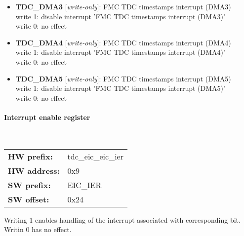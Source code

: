 \begin{itemize}
\begin{small}
\\
write 1: disable interrupt 'FMC TDC timestamps interrupt (DMA2)'\\write 0: no effect
\end{small}
\item \begin{small}
{\bf 
TDC\_DMA3
} [\emph{write-only}]: FMC TDC timestamps interrupt (DMA3)
\\
write 1: disable interrupt 'FMC TDC timestamps interrupt (DMA3)'\\write 0: no effect
\end{small}
\item \begin{small}
{\bf 
TDC\_DMA4
} [\emph{write-only}]: FMC TDC timestamps interrupt (DMA4)
\\
write 1: disable interrupt 'FMC TDC timestamps interrupt (DMA4)'\\write 0: no effect
\end{small}
\item \begin{small}
{\bf 
TDC\_DMA5
} [\emph{write-only}]: FMC TDC timestamps interrupt (DMA5)
\\
write 1: disable interrupt 'FMC TDC timestamps interrupt (DMA5)'\\write 0: no effect
\end{small}
\end{itemize}
\paragraph*{Interrupt enable register}\mbox{}\\\vskip 6pt
\begin{tabular}{l l }
{\bf HW prefix:}  & tdc\_eic\_eic\_ier\\
{\bf HW address:}  & 0x9\\
{\bf SW prefix:}  & EIC\_IER\\
{\bf SW offset:}  & 0x24\\
\end{tabular}

\vspace{12pt}
Writing 1 enables handling of the interrupt associated with corresponding bit. Writin 0 has no effect.

